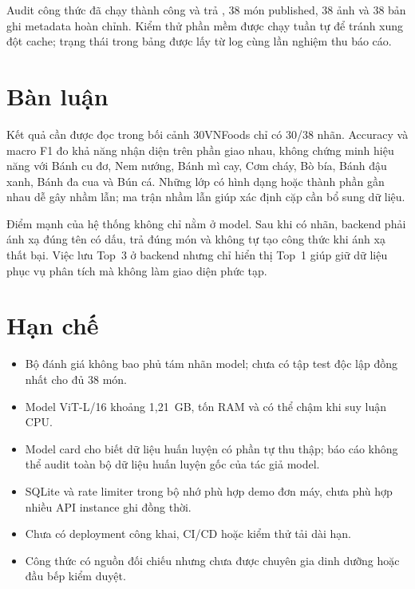 
Audit công thức đã chạy thành công và trả , 38 món published,
38 ảnh và 38 bản ghi metadata hoàn chỉnh. Kiểm thử phần mềm được chạy tuần
tự để tránh xung đột cache; trạng thái trong bảng được lấy từ log cùng lần
nghiệm thu báo cáo.

\section{Bàn luận}

Kết quả cần được đọc trong bối cảnh 30VNFoods chỉ có 30/38 nhãn. Accuracy và
macro F1 đo khả năng nhận diện trên phần giao nhau, không chứng minh hiệu
năng với Bánh cu đơ, Nem nướng, Bánh mì cay, Cơm cháy, Bò bía, Bánh đậu xanh,
Bánh đa cua và Bún cá. Những lớp có hình dạng hoặc thành phần gần nhau dễ gây
nhầm lẫn; ma trận nhầm lẫn giúp xác định cặp cần bổ sung dữ liệu.

Điểm mạnh của hệ thống không chỉ nằm ở model. Sau khi có nhãn, backend phải
ánh xạ đúng tên có dấu, trả đúng món và không tự tạo công thức khi ánh xạ
thất bại. Việc lưu Top~3 ở backend nhưng chỉ hiển thị Top~1 giúp giữ dữ liệu
phục vụ phân tích mà không làm giao diện phức tạp.

\section{Hạn chế}

\begin{itemize}
  \item Bộ đánh giá không bao phủ tám nhãn model; chưa có tập test độc lập
        đồng nhất cho đủ 38 món.
  \item Model ViT-L/16 khoảng 1,21~GB, tốn RAM và có thể chậm khi suy luận CPU.
  \item Model card cho biết dữ liệu huấn luyện có phần tự thu thập; báo cáo
        không thể audit toàn bộ dữ liệu huấn luyện gốc của tác giả model.
  \item SQLite và rate limiter trong bộ nhớ phù hợp demo đơn máy, chưa phù
        hợp nhiều API instance ghi đồng thời.
  \item Chưa có deployment công khai, CI/CD hoặc kiểm thử tải dài hạn.
  \item Công thức có nguồn đối chiếu nhưng chưa được chuyên gia dinh dưỡng
        hoặc đầu bếp kiểm duyệt.
\end{itemize}
